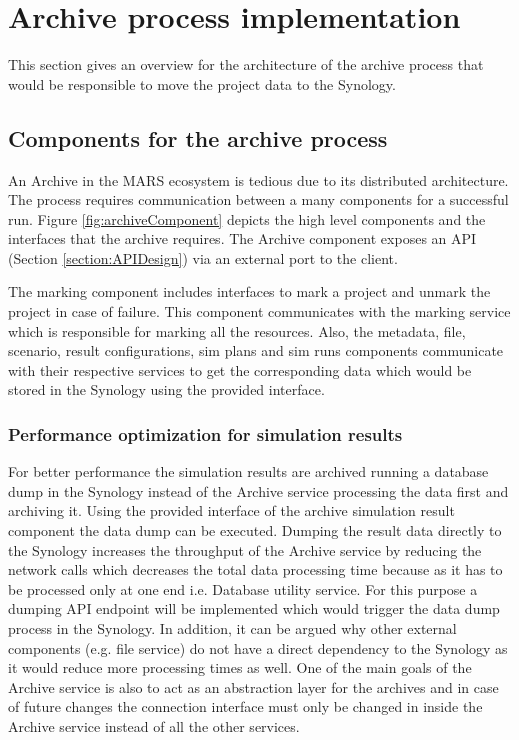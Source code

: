 \section{Archive process implementation}
This section gives an overview for the architecture of the archive process that would be responsible
to move the project data to the Synology. 

\subsection{Components for the archive process}
An Archive in the MARS ecosystem is tedious due to its distributed architecture. The process requires communication between a many components for a 
successful run. Figure \ref{fig:archiveComponent} depicts the high level components and the interfaces that the archive requires. The Archive
component exposes an API (Section \ref{section:APIDesign}) via an external port to the client. 

The marking component includes interfaces to mark a project and unmark the project in case of failure. This component communicates with the marking service which
is responsible for marking all the resources. Also, the metadata, file, scenario, result configurations, sim plans and sim runs components communicate with 
their respective services to get the corresponding data which would be stored in the Synology using the provided interface.

\subsubsection{Performance optimization for simulation results}
\label{subsubsec:performanceSim}
For better performance
the simulation results are archived running a database dump in the Synology instead of the Archive service processing the data first and archiving it. Using the provided interface of
the archive simulation result component the data dump can be executed. 
Dumping the result data directly to the Synology increases the throughput of the Archive service by reducing the network calls which decreases the total data processing
time because as it has to be processed only at one end i.e. Database utility service. For this purpose a dumping API endpoint will be implemented which would trigger the data dump process in the 
Synology. In addition, it can be argued why other external components (e.g. file service) do not have a direct dependency to the Synology as it would reduce more
processing times as well. One of the main goals of the Archive service is also to act as an abstraction layer for the archives and in case of future changes the
connection interface must only be changed in inside the Archive service instead of all the other services.


